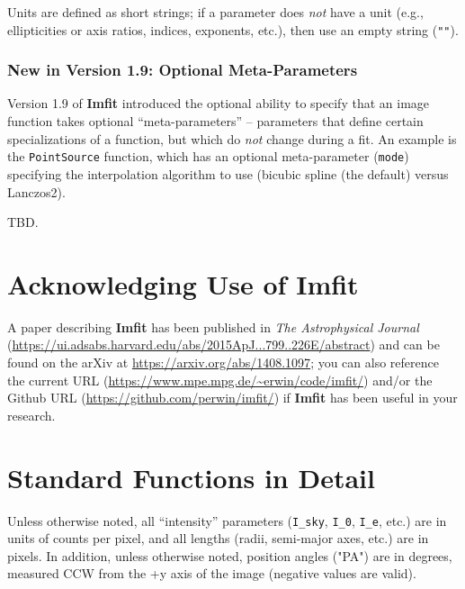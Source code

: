 \documentclass[10pt,a4paper,article]{memoir}
\newcommand{\imfit}{\textbf{Imfit}}
\newcommand{\Imfit}{\textbf{Imfit}}
\begin{document}
Units are defined as short strings; if a parameter does \textit{not} have
a unit (e.g., ellipticities or axis ratios, indices, exponents, etc.), then
use an empty string (\texttt{""}).



\subsection{New in Version 1.9: Optional Meta-Parameters}

Version 1.9 of \Imfit{} introduced the optional ability to specify that an
image function takes optional ``meta-parameters'' -- parameters that define
certain specializations of a function, but which do \textit{not} change
during a fit. An example is the \texttt{PointSource} function, which has
an optional meta-parameter (\texttt{mode}) specifying the interpolation
algorithm to use (bicubic spline (the default) versus Lanczos2).

TBD.



%
%



\newpage

\chapter{Acknowledging Use of \Imfit}

A paper describing \imfit{} \citep{erwin15} has been published in
\textit{The Astrophysical Journal}
(\url{https://ui.adsabs.harvard.edu/abs/2015ApJ...799..226E/abstract}) and can be
found on the arXiv at \url{https://arxiv.org/abs/1408.1097}; you can also
reference the current URL
(\url{https://www.mpe.mpg.de/~erwin/code/imfit/}) and/or the Github URL
(\url{https://github.com/perwin/imfit/}) if \imfit{} has been useful in
your research.


\newpage

\appendix
\chapter{Standard Functions in Detail}\label{app:functions}

Unless otherwise noted, all ``intensity'' parameters (\texttt{I\_sky},
\texttt{I\_0}, \texttt{I\_e}, etc.) are in units of counts per pixel, and all
lengths (radii, semi-major axes, etc.) are in pixels. In addition, unless
otherwise noted, position angles ("PA") are in degrees, measured CCW from
the +y axis of the image (negative values are valid).
\end{document}
